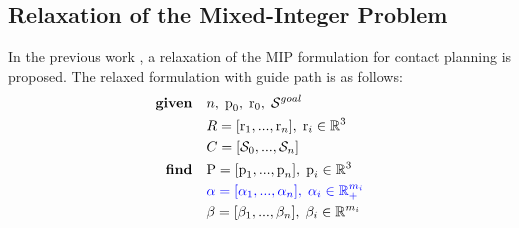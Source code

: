 \subsection{Relaxation of the Mixed-Integer Problem}
In the previous work \cite{sl1m_v1}, a relaxation of the MIP formulation for contact planning is proposed.
The relaxed formulation with guide path is as follows:
\begin{align}
    \textrm{\textbf{given}} %
                            \quad & n, \;\mbox{p}_0, \; \mbox{r}_0, \; \mathcal{S}^{goal} \nonumber\\
                            \quad & R=[\mbox{r}_1,...,\mbox{r}_n], \; \mbox{r}_i \in \mathbb{R}^{3} \nonumber\\
                            \quad & C=[\mathcal{S}_0, ..., \mathcal{S}_n] \nonumber\\
    \textrm{\textbf{find}}  \quad & \mbox{P}=[\mbox{p}_1,...,\mbox{p}_n], \;\mbox{p}_i \in \mathbb{R}^{3} \nonumber\\
                            \quad & \textcolor{blue}{\alpha=[\alpha_1,...,\alpha_n], \; \alpha_i \in \mathbb{R}_{+}^{m_i}} \label{eq:mbc:sl1m:slack_relaxed}\\
                            \quad & \beta=[\beta_1,...,\beta_n], \; \beta_i \in \mathbb{R}^{m_i} \nonumber\\

\end{align}

